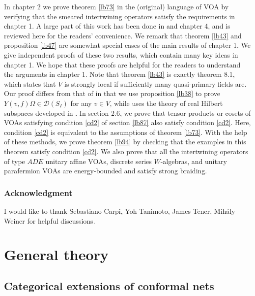 \documentclass[12pt,a4paper]{article}
\theoremstyle{definition}
\theoremstyle{plain}
\newcommand{\Dom}{\scr D}
\newcommand{\scr}{\mathscr}
\numberwithin{equation}{subsection}
\begin{document}
In chapter 2 we prove theorem \ref{lb73} in the (original) language of VOA by verifying that the smeared intertwining operators satisfy the requirements  in chapter 1. A large part of this work has been done in \cite{Gui19a} and \cite{Gui21a} chapter 4, and is reviewed here for the readers' convenience. We remark that theorem \ref{lb43} and proposition \ref{lb47} are somewhat special cases of the main results of chapter 1. We give independent proofs of these two results, which contain many key ideas in  chapter 1. We hope that these  proofs are helpful for the readers to understand the arguments in chapter 1. Note that theorem \ref{lb43} is exactly \cite{CKLW18} theorem 8.1, which states that $V$ is strongly local if sufficiently many quasi-primary fields are. Our proof  differs from that of \cite{CKLW18} in that we use proposition \ref{lb38} to prove $Y(v,f)\Omega\in\Dom(S_I)$ for any $v\in V$, while \cite{CKLW18} uses the theory of real Hilbert subspaces developed in \cite{Lon08}. In section 2.6, we prove that tensor products or cosets of VOAs satisfying condition \ref{cd2} of section \ref{lb87} also satisfy condition \ref{cd2}. Here, condition \ref{cd2} is equivalent to the assumptions of theorem \ref{lb73}. With the help of these methods, we prove theorem \ref{lb94} by checking that the examples in this theorem satisfy condition \ref{cd2}. We also prove that all the intertwining operators of type $ADE$ unitary affine VOAs, discrete series $W$-algebras, and unitary parafermion VOAs are energy-bounded and satisfy strong braiding.





\subsubsection*{Acknowledgment}

I would like to thank Sebastiano Carpi, Yoh Tanimoto, James Tener, Mih\'aly Weiner for helpful discussions.






\section{General theory}

\subsection{Categorical extensions of conformal nets}\label{lb29}
\end{document}
